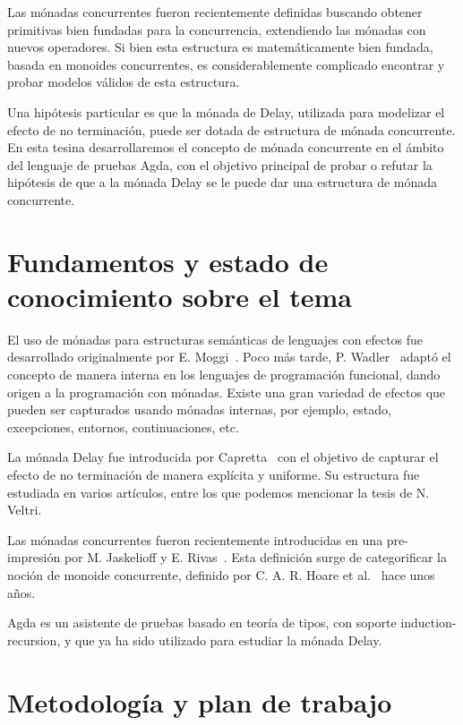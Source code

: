 \documentclass[11pt,a4paper]{article}
\begin{document}
Las mónadas concurrentes fueron recientemente definidas buscando
obtener primitivas bien fundadas para la concurrencia, extendiendo las
mónadas con nuevos operadores. Si bien esta estructura es
matemáticamente bien fundada, basada en monoides concurrentes, es
considerablemente complicado encontrar y probar modelos válidos de
esta estructura.

Una hipótesis particular es que la mónada de Delay, utilizada para
modelizar el efecto de no terminación, puede ser dotada de estructura
de mónada concurrente. En esta tesina desarrollaremos el concepto de
mónada concurrente en el ámbito del lenguaje de pruebas Agda, con el
objetivo principal de probar o refutar la hipótesis de que a la mónada
Delay se le puede dar una estructura de mónada concurrente.

\section{Fundamentos y estado de conocimiento sobre el tema}

El uso de mónadas para estructuras semánticas de lenguajes con efectos
fue desarrollado originalmente por E. Moggi~\cite{Mog:CLM,
  Mog:NCM}. Poco más tarde, P. Wadler~\cite{Wad:EFP} adaptó el
concepto de manera interna en los lenguajes de programación funcional,
dando origen a la programación con mónadas. Existe una gran variedad
de efectos que pueden ser capturados usando mónadas internas, por
ejemplo, estado, excepciones, entornos, continuaciones, etc.

La mónada Delay fue introducida por Capretta~\cite{Cap:GRCT} con el
objetivo de capturar el efecto de no terminación de manera explícita y
uniforme. Su estructura fue estudiada en varios artículos, entre los
que podemos mencionar la tesis de N. Veltri.

Las mónadas concurrentes fueron recientemente introducidas en una
pre-impresión por M. Jaskelioff y E. Rivas~\cite{RJ:MM}. Esta
definición surge de categorificar la noción de monoide concurrente,
definido por C. A. R. Hoare et al.~\cite{HHMOHPS:concmonoid} hace unos
años.

Agda es un asistente de pruebas basado en teoría de tipos, con soporte
induction-recursion, y que ya ha sido utilizado para estudiar la
mónada Delay.

\section{Metodología y plan de trabajo}
\end{document}
